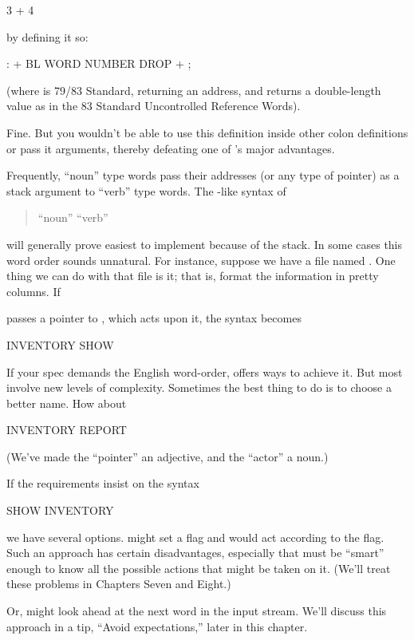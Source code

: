 \begin{Code}
3 + 4
\end{Code}
by defining it so:
\begin{Code}
: +   BL WORD  NUMBER DROP  + ;
\end{Code}
(where  is 79/83 Standard, returning an address, and 
returns a double-length value as in the 83 Standard Uncontrolled
Reference Words).

Fine. But you wouldn't be able to use this definition inside other
colon definitions or pass it arguments, thereby defeating one of \Forth{}'s
major advantages.

Frequently, ``noun'' type words pass their addresses (or any type of
pointer) as a stack argument to ``verb'' type words. The \Forth{}-like syntax of
\begin{quote}
{\sf ``noun'' ``verb''}
\end{quote}
will generally prove easiest to implement because of the stack.  In
some cases this word order sounds unnatural.
For instance, suppose we have a file named . One thing we can
do with that file is  it; that is, format the information in
pretty columns. If

 passes a pointer to , which acts upon it, the syntax
becomes
\begin{Code}
INVENTORY SHOW
\end{Code}
If your spec demands the English word-order,
\Forth{} offers ways to
achieve it. But most involve new levels of complexity. Sometimes the
best thing to do is to choose a better name. How about
\begin{Code}
INVENTORY REPORT
\end{Code}
(We've made the ``pointer'' an adjective, and the ``actor'' a noun.)

If the requirements insist on the syntax
\begin{Code}
SHOW INVENTORY
\end{Code}
we have several options.  might set a flag and  would act
according to the flag. Such an approach has certain disadvantages,
especially that  must be ``smart'' enough to know all the
possible actions that might be taken on it. (We'll treat these
problems in Chapters Seven and Eight.)

Or,  might look ahead at the next word in the input stream.
We'll discuss this approach in a tip, ``Avoid expectations,'' later in this
chapter.

